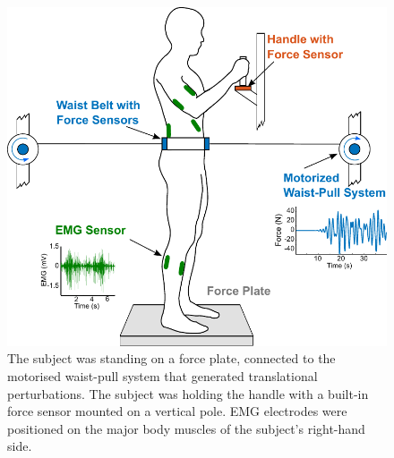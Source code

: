 \documentclass[final,5p,twocolumn]{elsarticle}
\begin{document}

\begin{figure}
	\begin{center}
		\includegraphics[width=\linewidth]{images/exp2_protocol.pdf}
		\caption{The subject was standing on a force plate, connected to the motorised waist-pull system that generated translational perturbations. The subject was holding the handle with a built-in force sensor mounted on a vertical pole. EMG electrodes were positioned on the major body muscles of the subject's right-hand side.}
		\label{fig:exp2_protocol}
	\end{center}
\end{figure}
\end{document}
